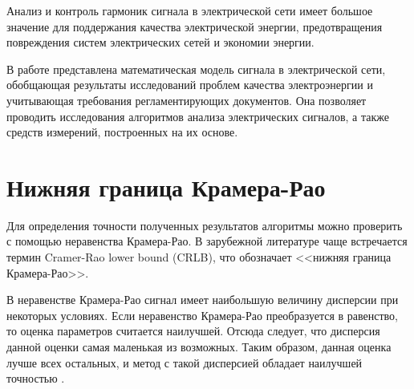 Анализ и контроль гармоник сигнала в электрической сети имеет большое значение для поддержания качества электрической энергии, предотвращения повреждения систем электрических сетей и экономии энергии. 

В работе представлена математическая модель сигнала в электрической сети, обобщающая результаты исследований проблем качества электроэнергии и учитывающая требования регламентирующих документов. Она позволяет проводить исследования алгоритмов анализа электрических сигналов, а также средств измерений, построенных на их основе.

\section{Нижняя граница Крамера-Рао} \label{sec:ch1/sec3}

Для определения точности полученных результатов алгоритмы можно проверить с помощью неравенства Крамера-Рао. В зарубежной литературе чаще встречается термин Cramer-Rao lower bound (CRLB), что обозначает <<нижняя граница Крамера-Рао>>. 

В неравенстве Крамера-Рао сигнал имеет наибольшую величину дисперсии при некоторых условиях. Если неравенство Крамера-Рао преобразуется в равенство, то оценка параметров считается наилучшей. Отсюда следует, что дисперсия данной оценки самая маленькая из возможных. Таким образом, данная оценка лучше всех остальных, и метод с такой дисперсией обладает наилучшей точностью \cite{4515960, 343082, kay1993fundamentals, 1439205, 668800, tran1990cramer}.





